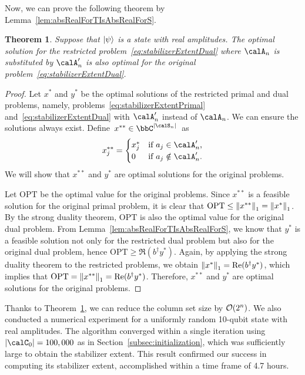 \documentclass[aps,prx,onecolumn,superscriptaddress,nobibnotes,nofootinbib]{revtex4-2}
\newtheorem{theorem}{Theorem}
\begin{document}
Now, we can prove the following theorem by Lemma~\ref{lem:absRealForTIsAbsRealForS}.
\begin{theorem}
  \label{thm:restrictedRealProblem}
  Suppose that $\ket{\psi}$ is a state
  with real amplitudes.
  The optimal solution for the restricted problem~\eqref{eq:stabilizerExtentDual} where $\calA_n$ is substituted by $\calA'_n$
  is also optimal for the original problem~\eqref{eq:stabilizerExtentDual}.
\end{theorem}
\begin{proof}
  Let $x^*$ and $y^*$ be the optimal solutions
  of the restricted primal and dual problems,
  namely, problems~\eqref{eq:stabilizerExtentPrimal}
  and~\eqref{eq:stabilizerExtentDual}
  with $\calA'_n$ instead of $\calA_n$.
  We can ensure the solutions always exist.
  Define~$x^{**} \in \bbC^{\abs{\calS_n}}$~as
  \begin{equation*}
    x^{**}_j=\begin{cases}
      x^*_j & \text{if $a_j \in \calA'_n$,}    \\
      0     & \text{if $a_j \notin \calA'_n$.}
    \end{cases}
  \end{equation*}
  We will show that $x^{**}$ and $y^{*}$ are optimal solutions for the original problems.

  Let $\mathrm{OPT}$ be the optimal value for the original problems.
  Since $x^{**}$ is a feasible solution for the original primal problem,
  it is clear that $\mathrm{OPT} \leq \norm{x^{**}}_1=\norm{x^*}_1$.
  By the strong duality theorem,
  $\mathrm{OPT}$ is also the optimal value
  for the original dual problem.
  From Lemma~\ref{lem:absRealForTIsAbsRealForS}, we know that $y^*$ is a feasible solution not only for the restricted dual problem but also for the original dual problem, hence $\mathrm{OPT} \geq \Re(b^\dagger y^*)$.
  Again, by applying the strong duality theorem
  to the restricted problems,
  we obtain $\norm{x^*}_1 = \Re(b^\dagger y^*)$,
  which implies that $\mathrm{OPT} = \norm{x^{**}}_1 = \Re(b^\dagger y^*)$.
  Therefore, $x^{**}$ and $y^*$ are optimal solutions
  for the original problems.
\end{proof}

Thanks to Theorem~\ref{thm:restrictedRealProblem}, we can reduce the column set size by $\order{2^n}$.
We also conducted a numerical experiment for a uniformly random 10-qubit state with real amplitudes.
The algorithm converged within a single iteration using $\abs{\calC_0}=100,000$ as in Section~\ref{subsec:initialization}, which was sufficiently large to obtain the stabilizer extent.
This result confirmed our success in computing its stabilizer extent, accomplished within a time frame of 4.7 hours.
\end{document}
